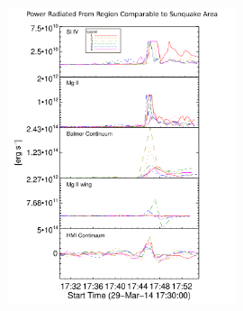 \begin{figure}[H]
  \begin{center}
  \includegraphics[width=0.6\textwidth]{29-Mar-14-A_sqk-Power-Ladder}

\end{center}
\end{figure}
